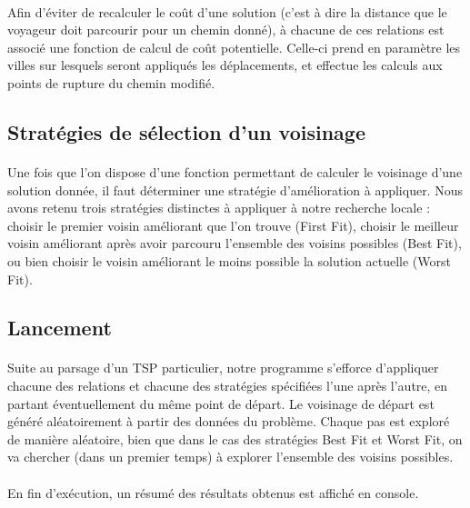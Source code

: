 \documentclass[a4paper,10pt]{report}
\begin{document}
\paragraph{}
Afin d'éviter de recalculer le coût d'une solution (c'est à dire la distance que le voyageur doit parcourir
pour un chemin donné), à chacune de ces relations est associé une fonction de calcul de coût potentielle.
Celle-ci prend en paramètre les villes sur lesquels seront appliqués les déplacements, et effectue les calculs
aux points de rupture du chemin modifié.


\subsection{Stratégies de sélection d'un voisinage}

\paragraph{}
  Une fois que l'on dispose d'une fonction permettant de calculer le voisinage d'une solution donnée, il faut déterminer
une stratégie d'amélioration à appliquer. Nous avons retenu trois stratégies distinctes à appliquer à notre recherche
locale : choisir le premier voisin améliorant que l'on trouve (First Fit), choisir le meilleur voisin améliorant après
avoir parcouru l'ensemble des voisins possibles (Best Fit), ou bien choisir le voisin améliorant le moins possible la
solution actuelle (Worst Fit).


\subsection{Lancement}

\paragraph{}
  Suite au parsage d'un TSP particulier, notre programme s'efforce d'appliquer chacune des relations et chacune
des stratégies spécifiées l'une après l'autre, en partant éventuellement du même point de départ. Le voisinage de
départ est généré aléatoirement à partir des données du problème. Chaque pas est exploré de manière aléatoire, bien
que dans le cas des stratégies Best Fit et Worst Fit, on va chercher (dans un premier temps) à explorer l'ensemble
des voisins possibles.

\paragraph{}
En fin d'exécution, un résumé des résultats obtenus est affiché en console.
\end{document}
